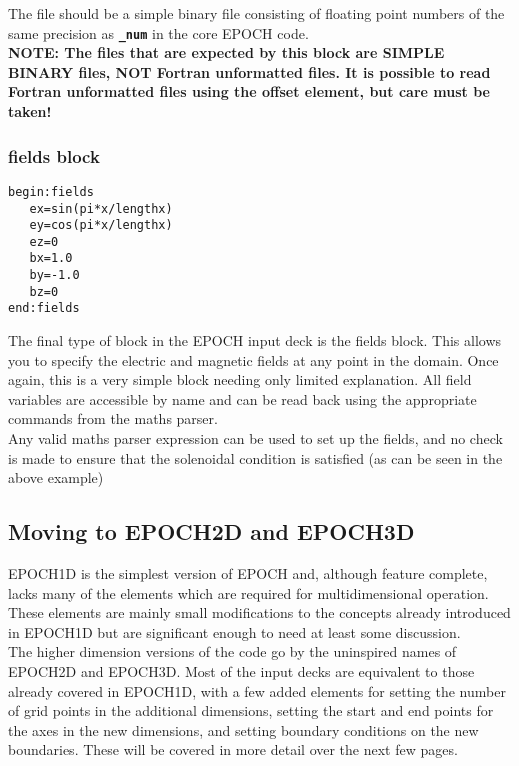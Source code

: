 \documentclass[12pt]{article}
\newcommand{\emphtext}{\color{warwickdark} \fontfamily{phv}\selectfont\Large\bf}
\newcommand{\boxverbatim}[1]{\begin{Verbatim}[obeytabs=true,frame=single,
  framerule=0.5mm,rulecolor=\color{warwickmid},label=#1]}
\newcommand{\inlinecode}[1]{{\color{warwickred} \bf\texttt{#1}}}
\newcommand{\inlineemph}[1]{{\color{warwicklight} \bf{#1}}}
\newcommand{\nEPOCH}{{\color{warwickdark}\fontfamily{phv}\selectfont EPOCH}}
\newcommand{\EPOCH}{{\nEPOCH} }
\begin{document}
The file should be a simple binary file consisting of floating point numbers of
the same precision as \inlinecode{\_num} in the core \EPOCH code.\\

{ \emphtext NOTE: The files that are expected by this block are SIMPLE BINARY
files, NOT Fortran unformatted files. It is possible to read Fortran
unformatted files using the offset element, but care must be taken!}\\

\subsubsection{\inlineemph{fields} block}
\boxverbatim{fields block}
begin:fields
   ex=sin(pi*x/lengthx)
   ey=cos(pi*x/lengthx)
   ez=0
   bx=1.0
   by=-1.0
   bz=0
end:fields
\end{Verbatim}

The final type of block in the \EPOCH input deck is the fields block. This
allows you to specify the electric and magnetic fields at any point in the
domain. Once again, this is a very simple block needing only limited
explanation. All field variables are accessible by name and can be read back
using the appropriate commands from the maths parser. \\

Any valid maths parser expression can be used to set up the fields, and no
check is made to ensure that the solenoidal condition is satisfied (as can be
seen in the above example)\\

\subsection{Moving to EPOCH2D and EPOCH3D}
EPOCH1D is the simplest version of \EPOCH and, although feature complete, lacks
many of the elements which are required for multidimensional operation. These
elements are mainly small modifications to the concepts already introduced in
EPOCH1D but are significant enough to need at least some discussion.\\

The higher dimension versions of the code go by the uninspired names of EPOCH2D
and EPOCH3D. Most of the input decks are equivalent to those already covered in
EPOCH1D, with a few added elements for setting the number of grid points in the
additional dimensions, setting the start and end points for the axes in the new
dimensions, and setting boundary conditions on the new boundaries. These will
be covered in more detail over the next few pages.\\
\end{document}
